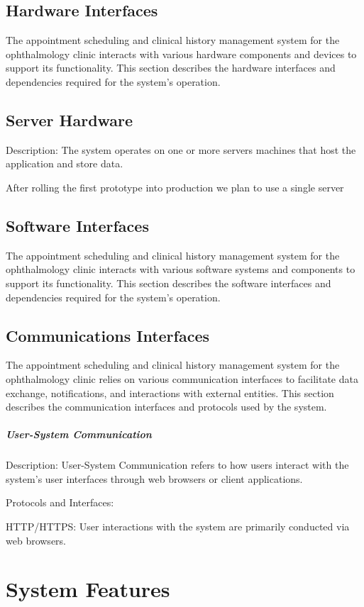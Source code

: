 \documentclass{scrreprt}
\begin{document}
	
	\section{Hardware Interfaces}
	The appointment scheduling and clinical history management system for the ophthalmology clinic interacts with various hardware components and devices to support its functionality. This section describes the hardware interfaces and dependencies required for the system's operation.
	\section{Server Hardware}
	Description: The system operates on one or more servers machines that host the application and store data. 
	
	After rolling the first prototype into production we plan to use a single server
	
	
	\section{Software Interfaces}
	The appointment scheduling and clinical history management system for the ophthalmology clinic interacts with various software systems and components to support its functionality. This section describes the software interfaces and dependencies required for the system's operation.
	
	
	\section{Communications Interfaces}
	The appointment scheduling and clinical history management system for the ophthalmology clinic relies on various communication interfaces to facilitate data exchange, notifications, and interactions with external entities. This section describes the communication interfaces and protocols used by the system.
	\paragraph{User-System Communication}
	Description: User-System Communication refers to how users interact with the system's user interfaces through web browsers or client applications.
	
	Protocols and Interfaces:
	
	HTTP/HTTPS: User interactions with the system are primarily conducted via web browsers.
	
	
	
	\chapter{System Features}
\end{document}
